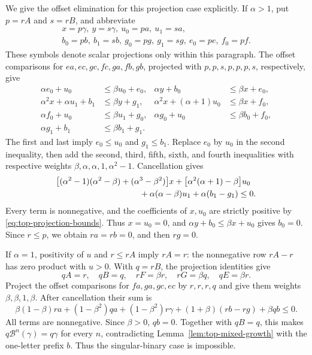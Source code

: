 \documentclass[11pt,a4paper]{article}
\begin{document}
We give the offset elimination for this projection case explicitly.
If $\alpha>1$, put $p=rA$ and $s=rB$, and abbreviate
\[
\begin{gathered}
x=p\gamma,\ y=s\gamma,\ u_0=pa,\ u_1=sa,\\
b_0=pb,\ b_1=sb,\ g_0=pg,\ g_1=sg,\ e_0=pe,\ f_0=pf.
\end{gathered}
\]
These symbols denote scalar projections only within this paragraph.
The offset comparisons for $ea,ec,gc,fc,ga,fb,gb$, projected with
$p,p,s,p,p,p,s$, respectively, give
\begin{align*}
\alpha e_0+u_0&\le\beta u_0+e_0,&
\alpha y+b_0&\le\beta x+e_0,\\
\alpha^2x+\alpha u_1+b_1&\le\beta y+g_1,&
\alpha^2x+(\alpha+1)u_0&\le\beta x+f_0,\\
\alpha f_0+u_0&\le\beta u_1+g_0,&
\alpha g_0+u_0&\le\beta b_0+f_0,\\
\alpha g_1+b_1&\le\beta b_1+g_1.
\end{align*}
The first and last imply $e_0\le u_0$ and $g_1\le b_1$.
Replace $e_0$ by $u_0$ in the second inequality, then add the second,
third, fifth, sixth, and fourth inequalities with respective weights
$\beta,\alpha,\alpha,1,\alpha^2-1$. Cancellation gives
\begin{align*}
&\bigl[(\alpha^2-1)(\alpha^2-\beta)
       +(\alpha^3-\beta^2)\bigr]x
 +\bigl[\alpha^2(\alpha+1)-\beta\bigr]u_0\\
&\hspace{35mm}+\alpha(\alpha-\beta)u_1
 +\alpha(b_1-g_1)\le0.
\end{align*}
Every term is nonnegative, and the coefficients of $x,u_0$ are
strictly positive by \eqref{eq:top-projection-bounds}.
Thus $x=u_0=0$, and $\alpha y+b_0\le\beta x+u_0$ gives $b_0=0$.
Since $r\le p$, we obtain $ra=rb=0$, and then $rg=0$.

If $\alpha=1$, positivity of $u$ and $r\le rA$ imply $rA=r$:
the nonnegative row $rA-r$ has zero product with $u>0$.
With $q=rB$, the projection identities give
\[
qA=r,\quad qB=q,\quad rF=\beta r,\quad
rG=\beta q,\quad qE=\beta r.
\]
Project the offset comparisons for $fa,ga,gc,ec$ by $r,r,r,q$
and give them weights $\beta,\beta,1,\beta$.
After cancellation their sum is
\[
\beta(1-\beta)ra+(1-\beta^2)qa+(1-\beta^2)r\gamma
 +(1+\beta)(rb-rg)+\beta qb\le0.
\]
All terms are nonnegative. Since $\beta>0$, $qb=0$.
Together with $qB=q$, this makes
$q\mathcal B^n(\gamma)=q\gamma$ for every $n$, contradicting
Lemma~\ref{lem:top-mixed-growth} with the one-letter prefix $b$.
Thus the singular-binary case is impossible.
\end{document}
